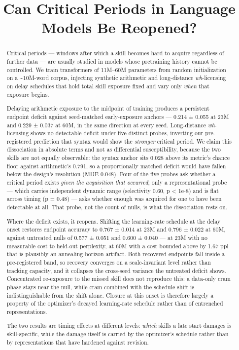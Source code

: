 \documentclass{article}
\title{Can Critical Periods in Language Models Be Reopened?}
\author{}
\begin{document}
\maketitle
\begin{abstract}
Critical periods --- windows after which a skill becomes hard to acquire regardless of
further data --- are usually studied in models whose pretraining history cannot be
controlled. We train transformers of 11M--60M parameters from random initialization on a
\textasciitilde10M-word corpus, injecting synthetic arithmetic and long-distance \emph{wh}-licensing on
delay schedules that hold total skill exposure fixed and vary only \emph{when} that exposure
begins.

Delaying arithmetic exposure to the midpoint of training produces a persistent
endpoint deficit against seed-matched early-exposure anchors --- 0.214 ± 0.055 at 23M and
0.229 ± 0.037 at 60M, in the same direction at every seed. Long-distance \emph{wh}-licensing
shows no detectable deficit under five distinct probes, inverting our pre-registered
prediction that syntax would show the \emph{stronger} critical period. We claim this
dissociation in absolute terms and not as differential susceptibility, because the two
skills are not equally observable: the syntax anchor sits 0.028 above its metric's
chance floor against arithmetic's 0.791, so a proportionally matched deficit would have
fallen below the design's resolution (MDE 0.048). Four of the five probes ask whether a
critical period exists \emph{given the acquisition that occurred}; only a representational
probe --- which carries independent dynamic range (selectivity 0.60, p \textless{} 1e-8) and is flat
across timing (p = 0.48) --- asks whether enough was acquired for one to have been
detectable at all. That probe, not the count of nulls, is what the dissociation rests on.

Where the deficit exists, it reopens. Shifting the learning-rate schedule at the delay
onset restores endpoint accuracy to 0.767 ± 0.014 at 23M and 0.796 ± 0.022 at 60M,
against untreated nulls of 0.577 ± 0.051 and 0.600 ± 0.040 --- at 23M with no measurable
cost to held-out perplexity, at 60M with a cost bounded above by 1.67 ppl that is
plausibly an annealing-horizon artifact. Both recovered endpoints fall inside a
pre-registered band, so recovery converges on a scale-invariant level rather than
tracking capacity, and it collapses the cross-seed variance the untreated deficit shows.
Concentrated re-exposure to the missed skill does not reproduce this: a data-only cram
phase stays near the null, while cram combined with the schedule shift is
indistinguishable from the shift alone. Closure at this onset is therefore largely a
property of the optimizer's decayed learning-rate schedule rather than of entrenched
representations.

The two results are timing effects at different levels: \emph{which} skills a late start
damages is skill-specific, while the damage itself is carried by the optimizer's
schedule rather than by representations that have hardened against revision.

\end{abstract}
\end{document}
